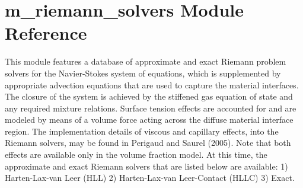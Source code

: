 \hypertarget{namespacem__riemann__solvers}{}\section{m\+\_\+riemann\+\_\+solvers Module Reference}
\label{namespacem__riemann__solvers}


This module features a database of approximate and exact Riemann problem solvers for the Navier-\/\+Stokes system of equations, which is supplemented by appropriate advection equations that are used to capture the material interfaces. The closure of the system is achieved by the stiffened gas equation of state and any required mixture relations. Surface tension effects are accounted for and are modeled by means of a volume force acting across the diffuse material interface region. The implementation details of viscous and capillary effects, into the Riemann solvers, may be found in Perigaud and Saurel (2005). Note that both effects are available only in the volume fraction model. At this time, the approximate and exact Riemann solvers that are listed below are available\+: 1) Harten-\/\+Lax-\/van Leer (H\+LL) 2) Harten-\/\+Lax-\/van Leer-\/\+Contact (H\+L\+LC) 3) Exact.  


